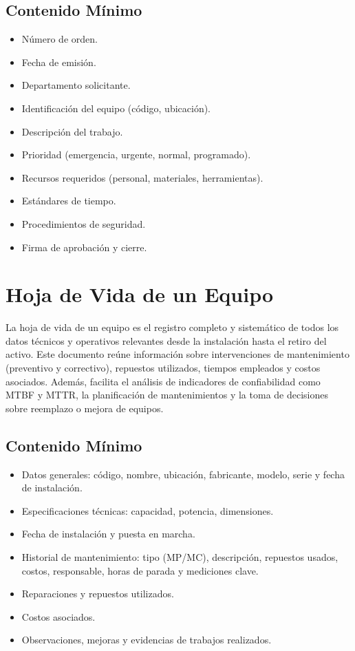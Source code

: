 \documentclass[12pt,letterpaper]{article}
\begin{document}
\subsection{Contenido Mínimo}
\begin{itemize}
    \item Número de orden.
    \item Fecha de emisión.
    \item Departamento solicitante.
    \item Identificación del equipo (código, ubicación).
    \item Descripción del trabajo.
    \item Prioridad (emergencia, urgente, normal, programado).
    \item Recursos requeridos (personal, materiales, herramientas).
    \item Estándares de tiempo.
    \item Procedimientos de seguridad.
    \item Firma de aprobación y cierre.
\end{itemize}

\section{Hoja de Vida de un Equipo}


La hoja de vida de un equipo es el registro completo y sistemático de todos los datos técnicos y operativos relevantes desde la instalación hasta el retiro del activo. Este documento reúne información sobre intervenciones de mantenimiento (preventivo y correctivo), repuestos utilizados, tiempos empleados y costos asociados. Además, facilita el análisis de indicadores de confiabilidad como MTBF y MTTR, la planificación de mantenimientos y la toma de decisiones sobre reemplazo o mejora de equipos.\parencite{duffuaa2000}
\subsection{Contenido Mínimo}
\begin{itemize}
    \item Datos generales: código, nombre, ubicación, fabricante, modelo, serie y fecha de instalación.
    \item Especificaciones técnicas: capacidad, potencia, dimensiones.
    \item Fecha de instalación y puesta en marcha.
    \item Historial de mantenimiento: tipo (MP/MC), descripción, repuestos usados, costos, responsable, horas de parada y mediciones clave.
    \item Reparaciones y repuestos utilizados.
    \item Costos asociados.
    \item Observaciones, mejoras y evidencias de trabajos realizados.
\end{itemize}
\end{document}

